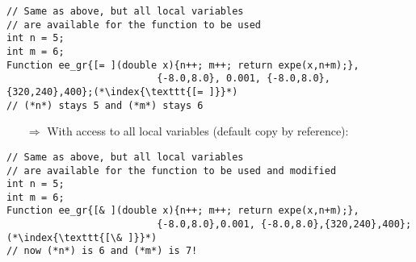\documentclass[10pt]{article}
\begin{document}
\begin{lstlisting}
// Same as above, but all local variables
// are available for the function to be used
int n = 5;
int m = 6;
Function ee_gr{[= ](double x){n++; m++; return expe(x,n+m);},
                          {-8.0,8.0}, 0.001, {-8.0,8.0},{320,240},400};(*\index{\texttt{[= ]}}*)
// (*n*) stays 5 and (*m*) stays 6 
 \end{lstlisting}
\begin{enumerate}
\item[$\Rightarrow$] With access to all local variables (default copy by reference):
\end{enumerate}
\begin{lstlisting}
// Same as above, but all local variables
// are available for the function to be used and modified
int n = 5;
int m = 6;
Function ee_gr{[& ](double x){n++; m++; return expe(x,n+m);},
                          {-8.0,8.0},0.001, {-8.0,8.0},{320,240},400};(*\index{\texttt{[\& ]}}*)
// now (*n*) is 6 and (*m*) is 7!
 \end{lstlisting}
%
%
\end{document}
